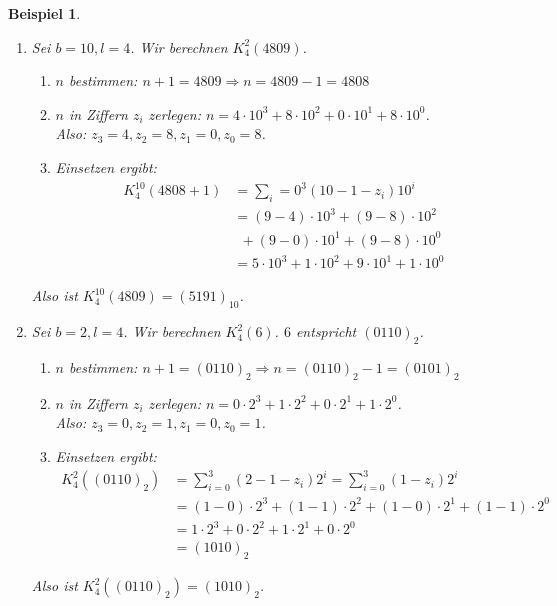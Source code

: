 \documentclass{article}
\newtheorem{beispiel}[satz]{Beispiel}
\begin{document}
  \begin{beispiel}
    \begin{enumerate}
      \item Sei $b=10, l=4$. Wir berechnen $K_4^2(4809)$.
        \begin{enumerate}
          \item $n$ bestimmen: $n+1 = 4809 \Rightarrow n = 4809 -1 = 4808$
          \item $n$ in Ziffern $z_i$ zerlegen: $n=4 \cdot 10^3 + 8 \cdot 10^2 + 0\cdot 10^1 + 8\cdot 10^0$. \\
           Also: $z_3 = 4, z_2 = 8, z_1 = 0, z_0 =8$.
          \item Einsetzen ergibt:
            \begin{align*}
              K_4^10(4808+1) &= \sum_i=0^3(10-1-z_i)10^i \\
              &= (9-4) \cdot 10^3 + (9-8) \cdot 10^2 \\ 
              &~~+ (9-0) \cdot 10^1 + (9-8) \cdot 10^0 \\
              &= 5 \cdot 10^3 + 1 \cdot 10^2 + 9 \cdot 10^1 + 1 \cdot 10^0
            \end{align*}
        \end{enumerate}
        Also ist $K_4^10(4809)=(5191)_10$.
      \item Sei $b=2, l=4$. Wir berechnen $K_4^2(6)$. $6$ entspricht $(0110)_2$.
        \begin{enumerate}
          \item $n$ bestimmen: $n+1 = (0110)_2 \Rightarrow n = (0110)_2 -1 = (0101)_2$
          \item $n$ in Ziffern $z_i$ zerlegen: $n=0 \cdot 2^3 + 1 \cdot 2^2 + 0\cdot 2^1 + 1\cdot 2^0$. \\
           Also: $z_3 = 0, z_2 = 1, z_1 = 0, z_0 =1$.
          \item Einsetzen ergibt:
            \begin{align*}
              K_4^2((0110)_2) &= \sum_{i=0}^3(2-1-z_i)2^i = \sum_{i=0}^3(1-z_i)2^i \\
              &= (1-0) \cdot 2^3 + (1-1) \cdot 2^2 + (1-0) \cdot 2^1 + (1-1) \cdot 2^0 \\
              &= 1 \cdot 2^3 + 0 \cdot 2^2 + 1\cdot 2^1 + 0\cdot 2^0 \\
              &= (1010)_2
            \end{align*}
        \end{enumerate}
        Also ist $K_4^2((0110)_2) = (1010)_2$.
    \end{enumerate}
  \end{beispiel}
\end{document}
